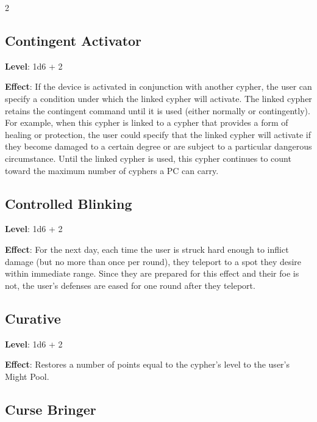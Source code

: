 \begin{multicols}{2}

\subsection{Contingent Activator}

\textbf{Level}: 1d6 + 2

\textbf{Effect}: If the device is activated in conjunction with another cypher, the user can specify a condition under which the linked cypher will activate. The linked cypher retains the contingent command until it is used (either normally or contingently). For example, when this cypher is linked to a cypher that provides a form of healing or protection, the user could specify that the linked cypher will activate if they become damaged to a certain degree or are subject to a particular dangerous circumstance. Until the linked cypher is used, this cypher continues to count toward the maximum number of cyphers a PC can carry.

\subsection{Controlled Blinking}

\textbf{Level}: 1d6 + 2

\textbf{Effect}: For the next day, each time the user is struck hard enough to inflict damage (but no more than once per round), they teleport to a spot they desire within immediate range. Since they are prepared for this effect and their foe is not, the user’s defenses are eased for one round after they teleport.

\subsection{Curative}

\textbf{Level}: 1d6 + 2

\textbf{Effect}: Restores a number of points equal to the cypher’s level to the user’s Might Pool.

\subsection{Curse Bringer}


\end{multicols}
